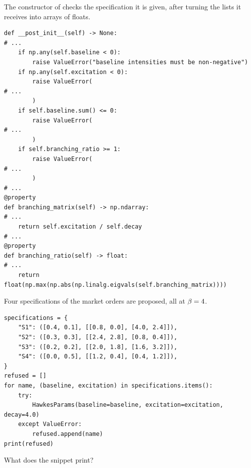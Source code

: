 \begin{question}
\label{question.whichOrderFlowSpecificationsAreRefused}
The constructor of  checks the specification it is given,
after turning the lists it receives into arrays of floats.
\begin{lstlisting}[caption={\protect\codehl{unito26.lob.hawkes.HawkesParams}: the checks of the constructor and the branching ratio, abridged.}, label=listing.whichOrderFlowSpecificationsAreRefusedChecks]
def __post_init__(self) -> None:
# ...
    if np.any(self.baseline < 0):
        raise ValueError("baseline intensities must be non-negative")
    if np.any(self.excitation < 0):
        raise ValueError(
# ...
        )
    if self.baseline.sum() <= 0:
        raise ValueError(
# ...
        )
    if self.branching_ratio >= 1:
        raise ValueError(
# ...
        )
# ...
@property
def branching_matrix(self) -> np.ndarray:
# ...
    return self.excitation / self.decay
# ...
@property
def branching_ratio(self) -> float:
# ...
    return float(np.max(np.abs(np.linalg.eigvals(self.branching_matrix))))
\end{lstlisting}
Four specifications of the market orders are proposed, all at $\beta = 4$.
\begin{lstlisting}[caption={Four specifications, and those the constructor refuses}, label=listing.whichOrderFlowSpecificationsAreRefusedRun]
specifications = {
    "S1": ([0.4, 0.1], [[0.8, 0.0], [4.0, 2.4]]),
    "S2": ([0.3, 0.3], [[2.4, 2.8], [0.8, 0.4]]),
    "S3": ([0.2, 0.2], [[2.0, 1.8], [1.6, 3.2]]),
    "S4": ([0.0, 0.5], [[1.2, 0.4], [0.4, 1.2]]),
}
refused = []
for name, (baseline, excitation) in specifications.items():
    try:
        HawkesParams(baseline=baseline, excitation=excitation, decay=4.0)
    except ValueError:
        refused.append(name)
print(refused)
\end{lstlisting}
What does the snippet print?
\begin{choices}
 \choice \codehl{[]}
 \choice \codehl{['S1', 'S3']}
 \correctchoice \codehl{['S3']}
 \choice \codehl{['S3', 'S4']}
 \choice \codehl{['S1', 'S2', 'S3']}
\end{choices}
\end{question}


